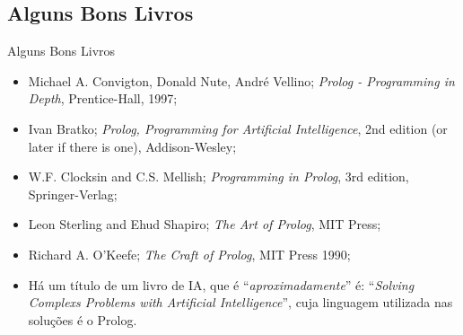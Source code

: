 \documentclass[sans]{beamer}
\begin{document}
\subsection{Alguns Bons Livros}
\begin{frame}

\begin{block}{Alguns Bons Livros}

\begin{itemize}
\item Michael A. Convigton, Donald
Nute, André Vellino; {\em Prolog - Programming in Depth},
Prentice-Hall, 1997;

\item Ivan Bratko; {\em Prolog, Programming
for Artificial Intelligence}, 2nd edition (or later if there is
one), Addison-Wesley;

\item W.F. Clocksin and C.S. Mellish;  {\em Programming in Prolog}, 3rd edition, Springer-Verlag;

\item Leon Sterling and Ehud Shapiro; {\em The Art of Prolog}, MIT Press;

\item Richard A. O'Keefe; {\em The Craft of Prolog}, MIT Press
1990;

\item  Há um título de um livro de IA, que é
``{\em aproximadamente}'' é: ``{\em Solving Complexs Problems with Artificial
Intelligence}'',  cuja linguagem utilizada nas soluções é o Prolog.


\end{itemize}
\end{block}
\end{frame}
\end{document}
